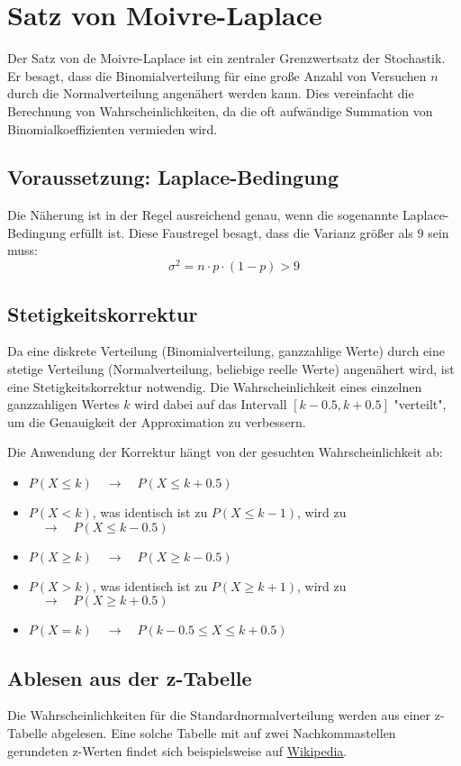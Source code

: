 \chapter{Satz von Moivre-Laplace}
\label{dml}
Der Satz von de Moivre-Laplace ist ein zentraler Grenzwertsatz der Stochastik. Er besagt, dass die Binomialverteilung für eine große Anzahl von Versuchen \(n\) durch die Normalverteilung angenähert werden kann. Dies vereinfacht die Berechnung von Wahrscheinlichkeiten, da die oft aufwändige Summation von Binomialkoeffizienten vermieden wird.

\section{Voraussetzung: Laplace-Bedingung}
Die Näherung ist in der Regel ausreichend genau, wenn die sogenannte Laplace-Bedingung erfüllt ist. Diese Faustregel besagt, dass die Varianz größer als 9 sein muss:
\[ \sigma^2 = n \cdot p \cdot (1-p) > 9 \]

\section{Stetigkeitskorrektur}
\label{sec:stetigkeitskorrektur}
Da eine diskrete Verteilung (Binomialverteilung, ganzzahlige Werte) durch eine stetige Verteilung (Normalverteilung, beliebige reelle Werte) angenähert wird, ist eine Stetigkeitskorrektur notwendig. Die Wahrscheinlichkeit eines einzelnen ganzzahligen Wertes \(k\) wird dabei auf das Intervall \([k-0.5, k+0.5]\) "verteilt", um die Genauigkeit der Approximation zu verbessern.

Die Anwendung der Korrektur hängt von der gesuchten Wahrscheinlichkeit ab:
\begin{itemize}
    \item \( P(X \le k) \quad \rightarrow \quad P(X \le k + 0.5) \)
    \item \( P(X < k) \), was identisch ist zu \(P(X \le k-1)\), wird zu \( \quad \rightarrow \quad P(X \le k - 0.5) \)
    \item \( P(X \ge k) \quad \rightarrow \quad P(X \ge k - 0.5) \)
    \item \( P(X > k) \), was identisch ist zu \(P(X \ge k+1)\), wird zu \( \quad \rightarrow \quad P(X \ge k + 0.5) \)
    \item \( P(X = k) \quad \rightarrow \quad P(k - 0.5 \le X \le k + 0.5) \)
\end{itemize}

\section{Ablesen aus der z-Tabelle}
Die Wahrscheinlichkeiten für die Standardnormalverteilung werden aus einer z-Tabelle abgelesen. Eine solche Tabelle mit auf zwei Nachkommastellen gerundeten z-Werten findet sich beispielsweise auf \href{https://de.wikipedia.org/wiki/Tabelle_Standardnormalverteilung}{Wikipedia}.

